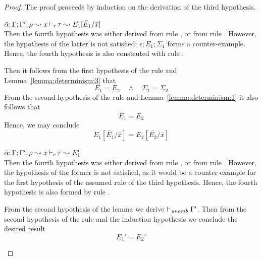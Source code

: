\begin{proof}
The proof proceeds by induction on the derivation of the third hypothesis.
\begin{description}
\setlength{\itemsep}{1em}
\item[\fbox{\texttt{(L-RuleMatch)}}]\quad$\bar{\alpha};\Gamma;\Gamma',\rho \leadsto x \mathop{\vdash_{r}} \tau \leadsto E_1[\bar{E}_1/\bar{x}]$ \ \\
  Then the fourth hypothesis was either derived from rule ,
  or from rule . However, the hypothesis of the latter is
  not satisfied: $\epsilon;E_1;\Sigma_1$ forms a counter-example. Hence, the fourth
  hypothesis is also construted with rule .

  Then it follows from the first hypothesis of the rule and Lemma~\ref{lemma:determinism:3} that
\begin{equation*}
  E_1 = E_2 \quad\wedge\quad \Sigma_1 = \Sigma_2
\end{equation*}
  From the second hypothesis of the rule and Lemma~\ref{lemma:determinism:1} it also follows that
\begin{equation*}
  \bar{E}_1 = \bar{E_2}
\end{equation*}
  Hence, we may conclude
\begin{equation*}
  E_1[\bar{E}_1/\bar{x}] = E_2[\bar{E_2}/\bar{x}]
\end{equation*}


\item[\fbox{\texttt{(L-RuleNoMatch)}}]\quad$\bar{\alpha};\Gamma;\Gamma',\rho \leadsto x \mathop{\vdash_{r}} \tau \leadsto E_1'$ \ \\
  Then the fourth hypothesis was either derived from rule ,
  or from rule . However, the hypothesis of the former is
  not satisfied, as it would be a counter-example for the first hypothesis of
  the assumed rule of the third hypothesis. Hence, the fourth hypothesis is also
  formed by rule .

  From the second hypothesis of the lemma we derive $\vdash_{\mathit{unamb}} \Gamma'$.
  Then from the second hypothesis of the rule and the induction hypothesis we conclude
  the desired result
\begin{equation*}
  E_1' = E_2'
\end{equation*}


\end{description}
\end{proof}
